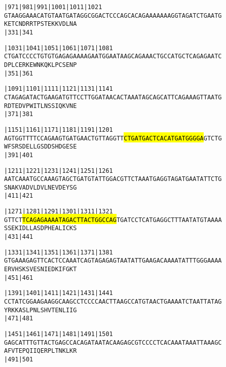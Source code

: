 \documentclass{article}
\begin{document}
\begin{alltt}
|971      |981      |991      |1001     |1011     |1021     
GTAAGGAAACATGTAATGATAGGCGGACTCCCAGCACAGAAAAAAAGGTAGATCTGAATG
  K  E  T  C  N  D  R  R  T  P  S  T  E  K  K  V  D  L  N  A
                    |331                          |341      

|1031     |1041     |1051     |1061     |1071     |1081     
CTGATCCCCTGTGTGAGAGAAAAGAATGGAATAAGCAGAAACTGCCATGCTCAGAGAATC
  D  P  L  C  E  R  K  E  W  N  K  Q  K  L  P  C  S  E  N  P
                    |351                          |361      

|1091     |1101     |1111     |1121     |1131     |1141     
CTAGAGATACTGAAGATGTTCCTTGGATAACACTAAATAGCAGCATTCAGAAAGTTAATG
  R  D  T  E  D  V  P  W  I  T  L  N  S  S  I  Q  K  V  N  E
                    |371                          |381      

|1151     |1161     |1171     |1181     |1191     |1201     
AGTGGTTTTCCAGAAGTGATGAACTGTTAGGTT\hl{CTGATGACTCACATGATGGGGA}GTCTG
  W  F  S  R  S  D  E  L  L  G  S  D  D  S  H  D  G  E  S  E
                    |391                          |401      

|1211     |1221     |1231     |1241     |1251     |1261     
AATCAAATGCCAAAGTAGCTGATGTATTGGACGTTCTAAATGAGGTAGATGAATATTCTG
  S  N  A  K  V  A  D  V  L  D  V  L  N  E  V  D  E  Y  S  G
                    |411                          |421      

|1271     |1281     |1291     |1301     |1311     |1321     
GTTCT\hl{TCAGAGAAAATAGACTTACTGGCCAG}TGATCCTCATGAGGCTTTAATATGTAAAA
  S  S  E  K  I  D  L  L  A  S  D  P  H  E  A  L  I  C  K  S
                    |431                          |441      

|1331     |1341     |1351     |1361     |1371     |1381     
GTGAAAGAGTTCACTCCAAATCAGTAGAGAGTAATATTGAAGACAAAATATTTGGGAAAA
  E  R  V  H  S  K  S  V  E  S  N  I  E  D  K  I  F  G  K  T
                    |451                          |461      

|1391     |1401     |1411     |1421     |1431     |1441     
CCTATCGGAAGAAGGCAAGCCTCCCCAACTTAAGCCATGTAACTGAAAATCTAATTATAG
  Y  R  K  K  A  S  L  P  N  L  S  H  V  T  E  N  L  I  I  G
                    |471                          |481      

|1451     |1461     |1471     |1481     |1491     |1501     
GAGCATTTGTTACTGAGCCACAGATAATACAAGAGCGTCCCCTCACAAATAAATTAAAGC
  A  F  V  T  E  P  Q  I  I  Q  E  R  P  L  T  N  K  L  K  R
                    |491                          |501      

\end{alltt}
\end{document}
